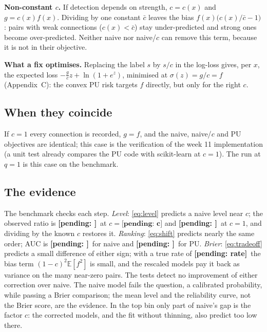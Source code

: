 \documentclass[conference]{IEEEtran}
\newcommand{\E}{\mathbb{E}}
\newcommand{\pending}[1]{\textbf{[pending: #1]}}
\providecommand{\CPrimary}{\pending{c}}\providecommand{\MeanY}{\pending{rate}}\providecommand{\PairsBelowFive}{\pending{share}}
\providecommand{\LevelNaive}{\pending{}}\providecommand{\LevelNaiveC}{\pending{}}\providecommand{\LevelPU}{\pending{}}\providecommand{\LevelNaiveSD}{\pending{}}
\providecommand{\AUCNaive}{\pending{}}\providecommand{\AUCPU}{\pending{}}\providecommand{\PooledDzero}{\pending{}}\providecommand{\PooledDone}{\pending{}}\providecommand{\PooledDtwo}{\pending{}}
\providecommand{\LevelQone}{\pending{}}\providecommand{\BrierQone}{\pending{}}\providecommand{\AUCQone}{\pending{}}\providecommand{\TopPQone}{\pending{}}\providecommand{\TopYQone}{\pending{}}
\begin{document}
\textbf{Non-constant $c$.} If detection depends on strength, $c=c(x)$ and $g=c(x)f(x)$. Dividing by one constant $\bar c$ leaves the bias $f(x)\big(c(x)/\bar c-1\big)$: pairs with weak connections ($c(x)<\bar c$) stay under-predicted and strong ones become over-predicted. Neither naive nor naive/$c$ can remove this term, because it is not in their objective.

\textbf{What a fix optimises.} Replacing the label $s$ by $s/c$ in the log-loss gives, per $x$, the expected loss $-\tfrac{g}{c}z+\ln(1+e^z)$, minimised at $\sigma(z)=g/c=f$ (Appendix~C): the convex PU risk \cite{duplessis2015} targets $f$ directly, but only for the right $c$.

\subsection{When they coincide}
If $c=1$ every connection is recorded, $g=f$, and the naive, naive/$c$ and PU objectives are identical; this case is the verification of the week 11 implementation (a unit test already compares the PU code with scikit-learn at $c=1$). The run at $q=1$ is this case on the benchmark.

\subsection{The evidence}
The benchmark checks each step. \emph{Level}: \eqref{eq:level} predicts a naive level near $c$; the observed ratio is \LevelNaive\ at $c=\CPrimary$ and \LevelQone\ at $c=1$, and dividing by the known $c$ restores it. \emph{Ranking}: \eqref{eq:shift} predicts nearly the same order; AUC is \AUCNaive\ for naive and \AUCPU\ for PU. \emph{Brier}: \eqref{eq:tradeoff} predicts a small difference of either sign; with a true rate of \MeanY\ the bias term $(1-c)^2\E[f^2]$ is small, and the rescaled models pay it back as variance on the many near-zero pairs. The tests detect no improvement of either correction over naive. The naive model fails the question, a calibrated probability, while passing a Brier comparison; the mean level and the reliability curve, not the Brier score, are the evidence. In the top bin only part of naive's gap is the factor $c$: the corrected models, and the fit without thinning, also predict too low there.
\end{document}
